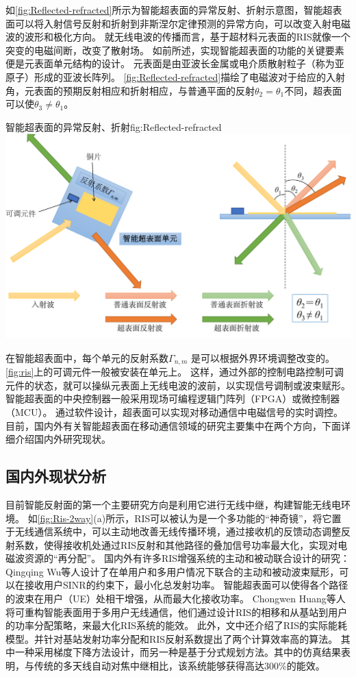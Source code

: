 \documentclass[supercite]{HustGraduPaper}
\begin{document}
如\autoref{fig:Reflected-refracted}所示为智能超表面的异常反射、折射示意图，智能超表面可以将入射信号反射和折射到非斯涅尔定律预测的异常方向，可以改变入射电磁波的波形和极化方向\cite{Renzo2019}。
就无线电波的传播而言，基于超材料元表面的RIS就像一个突变的电磁间断，改变了散射场。
如前所述，实现智能超表面的功能的关键要素便是元表面单元结构的设计\cite{5502350, liang2019large}。
元表面是由亚波长金属或电介质散射粒子（称为亚原子）形成的亚波长阵列\cite{basar2019wireless}。
\autoref{fig:Reflected-refracted}描绘了电磁波对于给应的入射角，元表面的预期反射相应和折射相应，与普通平面的反射$ \theta_2 =  \theta_1 $不同，超表面可以使$ \theta_3 \ne \theta_1 $。

\begin{generalfig}[htb]{智能超表面的异常反射、折射}{fig:Reflected-refracted}
	\includegraphics[width=0.8\linewidth]{Figures/Reflected-refracted.pdf}
\end{generalfig}

在智能超表面中，每个单元的反射系数$ \Gamma _ {n,m} $ 是可以根据外界环境调整改变的。
\autoref{fig:ris}上的可调元件一般被安装在单元上。
这样，通过外部的控制电路控制可调元件的状态，就可以操纵元表面上无线电波的波前，以实现信号调制或波束赋形。
智能超表面的中央控制器一般采用现场可编程逻辑门阵列（FPGA）或微控制器（MCU）。
通过软件设计，超表面可以实现对移动通信中电磁信号的实时调控。目前，国内外有关智能超表面在移动通信领域的研究主要集中在两个方向\cite{CHN_zhou2020}，下面详细介绍国内外研究现状。

\subsection{国内外现状分析}


目前智能反射面的第一个主要研究方向是利用它进行无线中继，构建智能无线电环境。
如\autoref{fig:Ris-2way}(a)所示，RIS可以被认为是一个多功能的“神奇镜”，将它置于无线通信系统中，可以主动地改善无线传播环境，通过接收机的反馈动态调整反射系数，使得接收机处通过RIS反射和其他路径的叠加信号功率最大化，实现对电磁波资源的“再分配”。
国内外有许多RIS增强系统的主动和被动联合设计的研究：Qingqing Wu等人设计了在单用户和多用户情况下联合的主动和被动波束赋形，可以在接收用户SINR的约束下，最小化总发射功率\cite{Wu2019}。
智能超表面可以使得各个路径的波束在用户（UE）处相干增强，从而最大化接收功率。
Chongwen Huang等人将可重构智能表面用于多用户无线通信，他们通过设计RIS的相移和从基站到用户的功率分配策略，来最大化RIS系统的能效。
此外，文中还介绍了RIS的实际能耗模型。并针对基站发射功率分配和RIS反射系数提出了两个计算效率高的算法。
其中一种采用梯度下降方法设计，而另一种是基于分式规划方法。其中的仿真结果表明，与传统的多天线自动对焦中继相比，该系统能够获得高达300\%的能效\cite{Huang2018a}。
\end{document}
